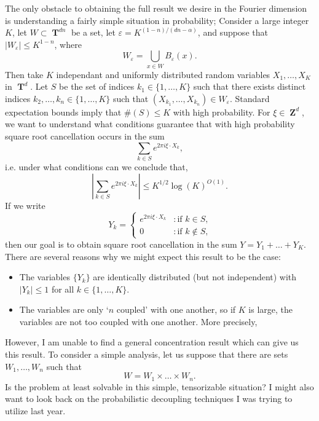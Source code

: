 \documentclass[openany,nobib,nols,a4paper,twoside,symmetric,justified,notoc]{tufte-book}
\theoremstyle{plain}
\theoremstyle{remark}
\theoremstyle{definition}
\DeclareMathOperator{\TT}{\mathbf{T}}
\DeclareMathOperator{\ZZ}{\mathbf{Z}}
\begin{document}
The only obstacle to obtaining the full result we desire in the Fourier dimension is understanding a fairly simple situation in probability; Consider a large integer $K$, let $W \subset \TT^{dn}$ be a set, let $\varepsilon = K^{(1 - n)/(dn - \alpha)}$, and suppose that $|W_\varepsilon| \leq K^{1-n}$, where
%
\[ W_\varepsilon = \bigcup_{x \in W} B_\varepsilon(x). \]
% 
Then take $K$ independant and uniformly distributed random variables $X_1, \dots, X_K$ in $\TT^d$. Let $S$ be the set of indices $k_1 \in \{ 1, \dots, K \}$ such that there exists distinct indices $k_2, \dots, k_n \in \{ 1, \dots, K \}$ such that $(X_{k_1}, \dots, X_{k_n}) \in W_\varepsilon$. Standard expectation bounds imply that $\#(S) \leq K$ with high probability. For $\xi \in \ZZ^d$, we want to understand what conditions guarantee that with high probability square root cancellation occurs in the sum
%
\[ \sum_{k \in S} e^{2 \pi i \xi \cdot X_k}, \]
%
i.e. under what conditions can we conclude that,
%
\[ \left| \sum_{k \in S} e^{2 \pi i \xi \cdot X_k} \right| \leq K^{1/2} \log(K)^{O(1)}. \]
%
If we write
%
\[ Y_k = \begin{cases} e^{2 \pi i \xi \cdot X_k} &: \text{if $k \in S$,}\\ 0 &: \text{if $k \not \in S$,} \end{cases} \]
%
then our goal is to obtain square root cancellation in the sum $Y = Y_1 + \dots + Y_K$. There are several reasons why we might expect this result to be the case:
%
\begin{itemize}
    \item The variables $\{ Y_k \}$ are identically distributed (but not independent) with $|Y_k| \leq 1$ for all $k \in \{ 1, \dots, K \}$.
    \item The variables are only `$n$ coupled' with one another, so if $K$ is large, the variables are not too coupled with one another. More precisely, 
\end{itemize}
%
However, I am unable to find a general concentration result which can give us this result. To consider a simple analysis, let us suppose that there are sets $W_1, \dots, W_n$ such that
%
\[ W = W_1 \times \dots \times W_n. \]
%
Is the problem at least solvable in this simple, tensorizable situation? I might also want to look back on the probabilistic decoupling techniques I was trying to utilize last year.
\end{document}
